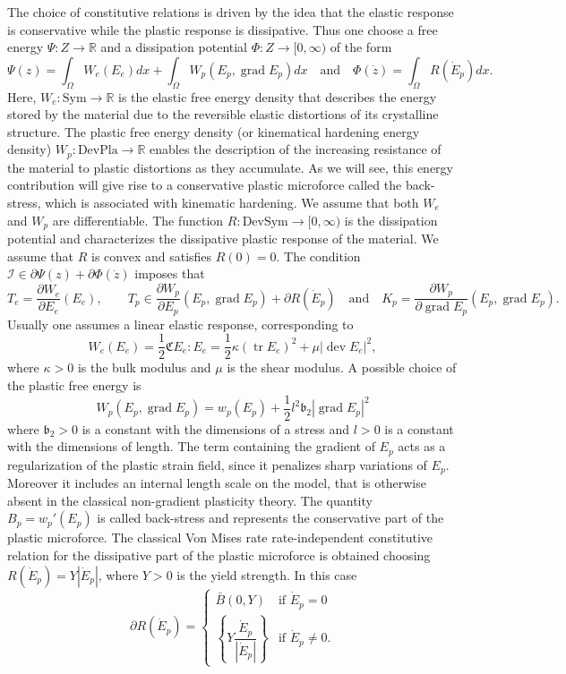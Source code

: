\documentclass[a4paper,10pt,twoside]{amsbook}
\numberwithin{section}{chapter}
\numberwithin{equation}{chapter}
\theoremstyle{definition}
\DeclareMathOperator{\dev}{dev}
\DeclareMathOperator{\tr}{tr}
\DeclareMathOperator{\grad}{grad}
\newcommand{\dind}[2]{\frac{\partial #1}{\partial #2}}
\begin{document}
The choice of constitutive relations is driven by the idea that the elastic response is conservative while the plastic response is dissipative. Thus one choose a free energy $\Psi\colon Z\to\mathbb{R}$ and a dissipation potential $\Phi\colon Z\to[0,\infty)$ of the form
\[
\Psi(z)=\int_\Omega W_e(E_e)dx+\int_\Omega W_p(E_p,\grad E_p)dx\quad\text{and}\quad\Phi(\dot z)=\int_\Omega R(\dot E_p)dx.
\]
Here, $W_e\colon\text{Sym}\to\mathbb{R}$ is the elastic free energy density that describes the energy stored by the material due to the reversible elastic distortions of its crystalline structure. The plastic free energy density (or kinematical hardening energy density) $W_p\colon\text{DevPla}\to\mathbb{R}$ enables the description of the increasing resistance of the material to plastic distortions as they accumulate. As we will see, this energy contribution will give rise to a conservative plastic microforce called the back-stress, which is associated with kinematic hardening. We assume that both $W_e$ and $W_p$ are differentiable. The function $R\colon\text{DevSym}\to[0,\infty)$ is the dissipation potential and characterizes the dissipative plastic response of the material. We assume that $R$ is convex and satisfies $R(0)=0$. The condition $\mathcal{I}\in\partial\Psi(z)+\partial\Phi(\dot z)$ imposes that
\[
T_e=\dind{W_e}{E_e}(E_e),\qquad T_p\in\dind{W_p}{E_p}(E_p,\grad E_p)+\partial R(\dot E_p)\quad\text{and}\quad K_p=\dind{W_p}{\grad E_p}(E_p,\grad E_p).
\]
Usually one assumes a linear elastic response, corresponding to
\[
W_e(E_e)=\frac{1}{2}\mathfrak{C}E_e:E_e=\frac{1}{2}\kappa(\tr E_e)^2+\mu|\dev E_e|^2,
\]
where $\kappa>0$ is the bulk modulus and $\mu$ is the shear modulus. A possible choice of the plastic free energy is
\[
W_p(E_p,\grad E_p)=w_p(E_p)+\frac{1}{2}l^2\mathfrak{b}_2|\grad E_p|^2
\]
where $\mathfrak{b}_2>0$ is a constant with the dimensions of a stress and $l>0$ is a constant with the dimensions of length. The term containing the gradient of $E_p$ acts as a regularization of the plastic strain field, since it penalizes sharp variations of $E_p$. Moreover it includes an internal length scale on the model, that is otherwise absent in the classical non-gradient plasticity theory. The quantity $B_p=w_p'(E_p)$ is called back-stress and represents the conservative part of the plastic microforce. The classical Von Mises rate rate-independent constitutive relation for the dissipative part of the plastic microforce is obtained choosing $R(\dot E_p)=Y|\dot E_p|$, where $Y>0$ is the yield strength. In this case
\[
\partial R(\dot E_p)=
\begin{cases}
\bar B(0,Y) & \text{if $\dot E_p=0$} \\
\left\{Y\dfrac{\dot E_p}{|\dot E_p|}\right\} & \text{if $\dot E_p\neq0$}.
\end{cases}
\]
\end{document}
